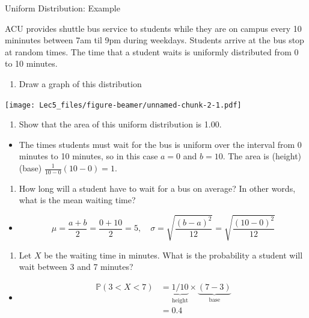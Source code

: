 \documentclass[ignorenonframetext,]{beamer}
\providecommand{\tightlist}{%
  \setlength{\itemsep}{0pt}\setlength{\parskip}{0pt}}
\begin{document}
\begin{frame}{Uniform Distribution: Example}

ACU provides shuttle bus service to students while they are on campus
every 10 mininutes between 7am til 9pm during weekdays. Students arrive
at the bus stop at random times. The time that a student waits is
uniformly distributed from 0 to 10 minutes.

\begin{enumerate}
\def\labelenumi{\arabic{enumi}.}
\tightlist
\item
  Draw a graph of this distribution
\end{enumerate}

\texttt{[image: Lec5\_files/figure-beamer/unnamed-chunk-2-1.pdf]}

\begin{enumerate}
\def\labelenumi{\arabic{enumi}.}
\setcounter{enumi}{1}
\tightlist
\item
  Show that the area of this uniform distribution is 1.00.
\end{enumerate}

\begin{itemize}[<+->]
\tightlist
\item
  The times students must wait for the bus is uniform over the interval
  from 0 minutes to 10 minutes, so in this case \(a=0\) and \(b=10\).
  The area is (height)(base) \(\frac{1}{10-0}(10-0)=1\).
\end{itemize}

\begin{enumerate}
\def\labelenumi{\arabic{enumi}.}
\setcounter{enumi}{2}
\tightlist
\item
  How long will a student have to wait for a bus on average? In other
  words, what is the mean waiting time?
\end{enumerate}

\begin{itemize}[<+->]
\tightlist
\item
  \[\mu=\frac{a+b}{2}=\frac{0+10}{2}=5,\quad \sigma=\sqrt{\frac{(b-a)^2}{12}}=\sqrt{\frac{(10-0)^2}{12}}\]
\end{itemize}

\begin{enumerate}
\def\labelenumi{\arabic{enumi}.}
\setcounter{enumi}{3}
\tightlist
\item
  Let \(X\) be the waiting time in minutes. What is the probability a
  student will wait between 3 and 7 minutes?
\end{enumerate}

\begin{itemize}[<+->]
\item
  \begin{align*}
  \mathbb{P}(3<X<7)&=\underbrace{1/10}_{\text{height}}\times \underbrace{(7-3)}_{\text{base}}\\
  &=0.4
  \end{align*}
\end{itemize}

\end{frame}
\end{document}
